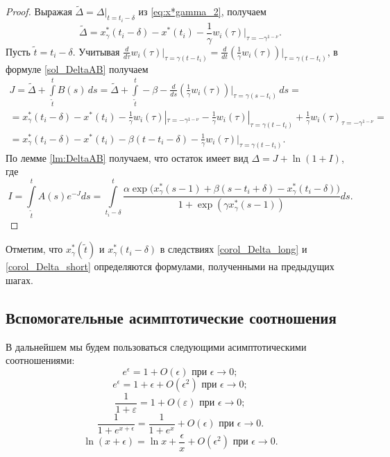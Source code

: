%
\begin{proof}
	Выражая $\tilde{\Delta} = \Delta|_{t = t_i - \delta}$ из \eqref{eq:x*gamma_2}, получаем
\[
	\tilde{\Delta} = x^*_{\gamma}(t_i - \delta) - x^*(t_i) - \frac{1}{\gamma} w_i(\tau)|_{\tau = -\gamma^{1-\nu}}.
\]
Пусть $\tilde{t} = t_i - \delta$. Учитывая $\frac{d}{d\tau} w_i(\tau)|_{\tau = \gamma(t - t_i)} = \frac{d}{dt} \left(\frac{1}{\gamma}w_i(\tau)\right)\Big|_{\tau = \gamma(t - t_i)}$, в формуле \eqref{sol_DeltaAB} получаем
\begin{multline*}
	J = \tilde{\Delta} + \int\limits_{\tilde{t}}^{t} B(s)\,ds = \tilde{\Delta} + \int\limits_{\tilde{t}}^{t} -\beta - \frac{d}{ds} \left(\frac{1}{\gamma}w_i(\tau)\right)\Big|_{\tau = \gamma(s - t_i)} \,ds =\\= x^*_{\gamma}(t_i - \delta) - x^*(t_i) - \frac{1}{\gamma} w_i(\tau)|_{\tau = -\gamma^{1-\nu}} - \frac{1}{\gamma}w_i(\tau)|_{\tau = \gamma(t - t_i)} + \frac{1}{\gamma}w_i(\tau)_{\tau = -\gamma^{1 - \nu}} = \\
	= x^*_{\gamma}(t_i - \delta) - x^*(t_i) - \beta(t - t_i - \delta) - \frac{1}{\gamma} w_i(\tau)|_{\tau = \gamma(t - t_i)}.
\end{multline*}
%
По лемме \ref{lm:DeltaAB} получаем, что остаток имеет вид $\Delta = J + \ln(1 + I)$, где 
\[
I = \int\limits_{\tilde{t}}^{t}A(s) e^{-J} ds = \int\limits_{t_i-\delta}^{t}\frac{\alpha\exp\big(x_{\gamma}^*(s-1)+\beta(s-t_i+\delta)-x_{\gamma}^*(t_i-\delta)\big)}{1+\exp(\gamma x_{\gamma}^*(s-1))}ds.
\]
\end{proof}
%
Отметим, что $x_{\gamma}^*(\tilde{t})$ и $x_{\gamma}^*(t_i-\delta)$ в следствиях \ref{corol_Delta_long} и \ref{corol_Delta_short} определяются формулами, полученными на предыдущих шагах.

\subsection{Вспомогательные асимптотические соотношения}

В дальнейшем мы будем пользоваться следующими асимптотическими соотношениями:
\begin{equation}
\label{eq:exp_const}
	e^{\epsilon} = 1 + O(\epsilon) \text{ при } \epsilon \to 0;
\end{equation}
\begin{equation}
\label{eq:exp_linear}
	e^{\epsilon} = 1 + \epsilon + O(\epsilon^2) \text{ при } \epsilon \to 0;
\end{equation}
\begin{equation}
\label{eq:asymp_frac}
	\frac{1}{1 + \varepsilon} = 1 + O(\varepsilon) \text{ при } \epsilon \to 0;
\end{equation}
\begin{equation}
\label{eq:exp_frac}
	\dfrac{1}{1 + e^{x + \epsilon}} = \frac{1}{1 + e^x} + O(\epsilon) \text{ при } \epsilon \to 0.
\end{equation}
\begin{equation}
\label{eq:ln_frac}
\ln(x + \epsilon) = \ln x + \frac{\epsilon}{x} + O(\epsilon^2) \text{ при } \epsilon \to 0.
\end{equation}

